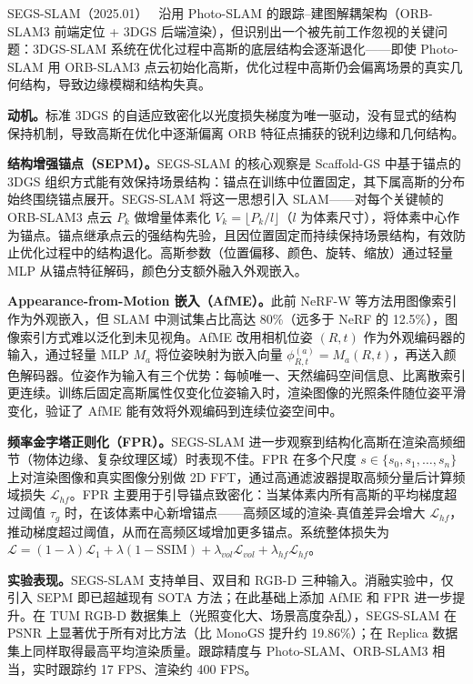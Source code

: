 SEGS-SLAM（2025.01）~\cite{2501_05242} 沿用 Photo-SLAM 的跟踪--建图解耦架构（ORB-SLAM3 前端定位 + 3DGS 后端渲染），但识别出一个被先前工作忽视的关键问题：3DGS-SLAM 系统在优化过程中高斯的底层结构会逐渐退化——即使 Photo-SLAM 用 ORB-SLAM3 点云初始化高斯，优化过程中高斯仍会偏离场景的真实几何结构，导致边缘模糊和结构失真。

\textbf{动机。}标准 3DGS 的自适应致密化以光度损失梯度为唯一驱动，没有显式的结构保持机制，导致高斯在优化中逐渐偏离 ORB 特征点捕获的锐利边缘和几何结构。

\textbf{结构增强锚点（SEPM）。}SEGS-SLAM 的核心观察是 Scaffold-GS 中基于锚点的 3DGS 组织方式能有效保持场景结构：锚点在训练中位置固定，其下属高斯的分布始终围绕锚点展开。SEGS-SLAM 将这一思想引入 SLAM——对每个关键帧的 ORB-SLAM3 点云 $P_k$ 做增量体素化 $V_k = \lfloor P_k / l \rfloor$（$l$ 为体素尺寸），将体素中心作为锚点。锚点继承点云的强结构先验，且因位置固定而持续保持场景结构，有效防止优化过程中的结构退化。高斯参数（位置偏移、颜色、旋转、缩放）通过轻量 MLP 从锚点特征解码，颜色分支额外融入外观嵌入。

\textbf{Appearance-from-Motion 嵌入（AfME）。}此前 NeRF-W 等方法用图像索引作为外观嵌入，但 SLAM 中测试集占比高达 80\%（远多于 NeRF 的 12.5\%），图像索引方式难以泛化到未见视角。AfME 改用相机位姿 $(R, t)$ 作为外观编码器的输入，通过轻量 MLP $M_a$ 将位姿映射为嵌入向量 $\phi^{(a)}_{R,t} = M_a(R, t)$，再送入颜色解码器。位姿作为输入有三个优势：每帧唯一、天然编码空间信息、比离散索引更连续。训练后固定高斯属性仅变化位姿输入时，渲染图像的光照条件随位姿平滑变化，验证了 AfME 能有效将外观编码到连续位姿空间中。

\textbf{频率金字塔正则化（FPR）。}SEGS-SLAM 进一步观察到结构化高斯在渲染高频细节（物体边缘、复杂纹理区域）时表现不佳。FPR 在多个尺度 $s \in \{s_0, s_1, \ldots, s_n\}$ 上对渲染图像和真实图像分别做 2D FFT，通过高通滤波器提取高频分量后计算频域损失 $\mathcal{L}_{hf}$。FPR 主要用于引导锚点致密化：当某体素内所有高斯的平均梯度超过阈值 $\tau_g$ 时，在该体素中心新增锚点——高频区域的渲染-真值差异会增大 $\mathcal{L}_{hf}$，推动梯度超过阈值，从而在高频区域增加更多锚点。系统整体损失为 $\mathcal{L} = (1-\lambda)\mathcal{L}_1 + \lambda(1-\text{SSIM}) + \lambda_{vol}\mathcal{L}_{vol} + \lambda_{hf}\mathcal{L}_{hf}$。

\textbf{实验表现。}SEGS-SLAM 支持单目、双目和 RGB-D 三种输入。消融实验中，仅引入 SEPM 即已超越现有 SOTA 方法；在此基础上添加 AfME 和 FPR 进一步提升。在 TUM RGB-D 数据集上（光照变化大、场景高度杂乱），SEGS-SLAM 在 PSNR 上显著优于所有对比方法（比 MonoGS 提升约 19.86\%）；在 Replica 数据集上同样取得最高平均渲染质量。跟踪精度与 Photo-SLAM、ORB-SLAM3 相当，实时跟踪约 17 FPS、渲染约 400 FPS。

